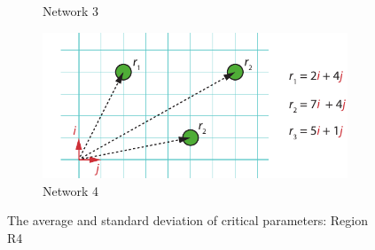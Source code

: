 \documentclass[a4paper]{article}
\begin{document}
\begin{figure}
\begin{subfigure}[b]{0.475\textwidth}
    \caption[]%
      {{\small Network 3}}    
    \label{fig:mean and std of net34}
  \end{subfigure}
  \quad
  \begin{subfigure}[b]{0.475\textwidth}   
     \centering 
     \includegraphics[width=\textwidth]{../figures/position_vectors_4}
     \caption[]%
       {{\small Network 4}}    
     \label{fig:mean and std of net44}
   \end{subfigure}
 \caption[ The average and standard deviation of critical parameters ]
   {\small The average and standard deviation of critical parameters: Region R4} 
 \label{fig:mean and std of nets}
\end{figure}
\end{document}
